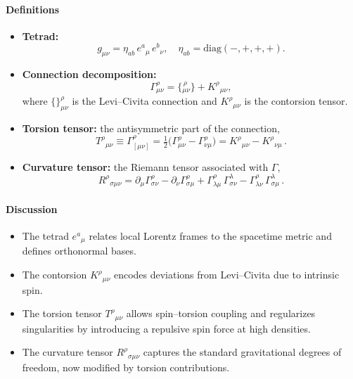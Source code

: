 \documentclass{article}
\begin{document}
\paragraph{Definitions}
\begin{itemize}
  \item \textbf{Tetrad:} 
    \begin{equation}\label{eq:auto1}
g_{\mu\nu} = \eta_{ab}\,e^a{}_\mu\,e^b{}_\nu,
      \quad
      \eta_{ab}=\mathrm{diag}(-,+,+,+).
\end{equation}
  \item \textbf{Connection decomposition:}
    \begin{equation}\label{eq:auto2}
\Gamma^\rho_{\mu\nu}
      = \bigl\{\!^{\,\rho}_{\mu\nu}\bigr\}
      + K^\rho{}_{\mu\nu},
\end{equation}
    where $\{\}^\rho_{\mu\nu}$ is the Levi–Civita connection and $K^\rho{}_{\mu\nu}$ is the contorsion tensor.
  \item \textbf{Torsion tensor:} the antisymmetric part of the connection,
    \begin{equation}\label{eq:auto3}
T^\rho{}_{\mu\nu} \equiv \Gamma^\rho_{[\mu\nu]}
       = \tfrac12\bigl(\Gamma^\rho_{\mu\nu}-\Gamma^\rho_{\nu\mu}\bigr)
       = K^\rho{}_{\mu\nu}-K^\rho{}_{\nu\mu}\,.
\end{equation}



  
  \item \textbf{Curvature tensor:} the Riemann tensor associated with $\Gamma$,
    \begin{equation}\label{eq:auto4}
R^\rho{}_{\sigma\mu\nu}
      = \partial_\mu\Gamma^\rho_{\sigma\nu}
      - \partial_\nu\Gamma^\rho_{\sigma\mu}
      + \Gamma^\rho_{\lambda\mu}\,\Gamma^\lambda_{\sigma\nu}
      - \Gamma^\rho_{\lambda\nu}\,\Gamma^\lambda_{\sigma\mu}\,.
\end{equation}
\end{itemize}

\paragraph{Discussion}
\begin{itemize}
  \item The tetrad $e^a{}_\mu$ relates local Lorentz frames to the spacetime metric and defines orthonormal bases.
  \item The contorsion $K^\rho{}_{\mu\nu}$ encodes deviations from Levi–Civita due to intrinsic spin.
  \item The torsion tensor $T^\rho{}_{\mu\nu}$ allows spin–torsion coupling and regularizes singularities by introducing a repulsive spin force at high densities.
  \item The curvature tensor $R^\rho{}_{\sigma\mu\nu}$ captures the standard gravitational degrees of freedom, now modified by torsion contributions.
\end{itemize}
\end{document}
